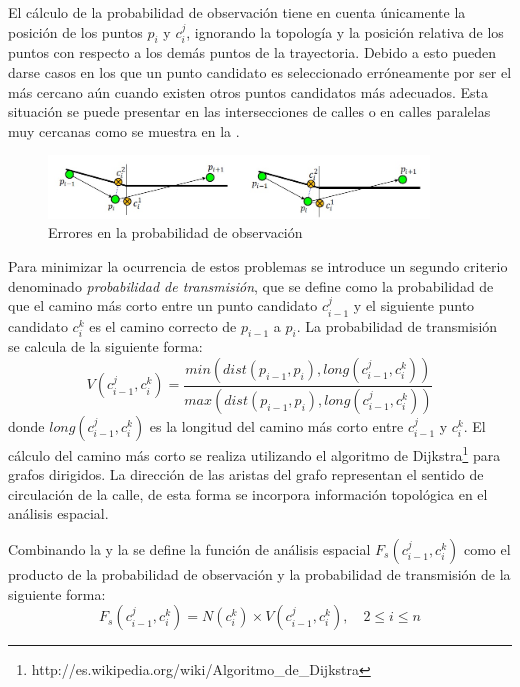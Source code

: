 El cálculo de la probabilidad de observación tiene en cuenta únicamente la posición de los puntos $p_i$ y $c_{i}^{j}$, ignorando la topología y la posición relativa de los puntos con respecto a los demás puntos de la trayectoria. Debido a esto pueden darse casos en los que un punto candidato es seleccionado erróneamente por ser el más cercano aún cuando existen otros puntos candidatos más adecuados. Esta situación se puede presentar en las intersecciones de calles o en calles paralelas muy cercanas como se muestra en la .

\begin{figure}[h*]
	\centering
	\includegraphics[width=0.9\textwidth]{capitulos/6/figuras/figura7.jpg}
	\caption{\label{fig:probabilidad_transmision} Errores en la probabilidad de observación}	
\end{figure}

Para minimizar la ocurrencia de estos problemas se introduce un segundo criterio denominado \emph{probabilidad de transmisión}, que se define como la probabilidad de que el camino más corto entre un punto candidato $c_{i-1}^{j}$ y el siguiente punto candidato $c_{i}^{k}$ es el camino correcto de $p_{i-1}$ a $p_i$. La probabilidad de transmisión se calcula de la siguiente forma: 
\begin{equation} \label{probabilidad_de_transmision}
V(c_{i-1}^{j}, c_{i}^{k}) = \frac { min( dist(p_{i-1}, p_i), long(c_{i-1}^{j}, c_{i}^{k})) }{ max (dist(p_{i-1}, p_i), long(c_{i-1}^{j}, c_{i}^{k})) }
\end{equation}
donde $long(c_{i-1}^{j}, c_{i}^{k})$ es la longitud del camino más corto entre $c_{i-1}^{j}$ y $c_{i}^{k}$. El cálculo del camino más corto se realiza utilizando el algoritmo de Dijkstra\footnote{http://es.wikipedia.org/wiki/Algoritmo\_de\_Dijkstra} para grafos dirigidos. La dirección de las aristas del grafo representan el sentido de circulación de la calle, de esta forma se incorpora información topológica en el análisis espacial. 

Combinando la  y la  se define la función de análisis espacial $F_s(c_{i-1}^{j},c_{i}^{k})$ como el producto de la probabilidad de observación y la probabilidad de transmisión de la siguiente forma:
\begin{equation} \label{funcion_espacial}
F_s(c_{i-1}^{j},c_{i}^{k}) = N(c_{i}^{k}) \times V(c_{i-1}^{j}, c_{i}^{k}), \quad 2 \le i \le n 
\end{equation}

